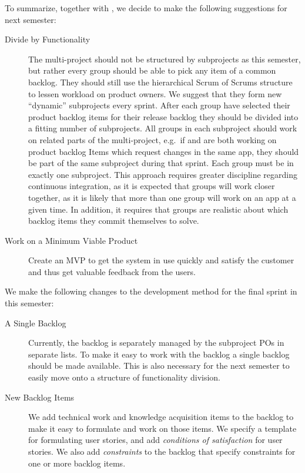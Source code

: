 To summarize, together with , we decide to make the following suggestions for next semester:

\begin{description}
  \item[Divide by Functionality] The multi-project should not be structured by subprojects as this semester, but rather every group should be able to pick any item of a common backlog. They should still use the hierarchical Scrum of Scrums structure to lessen workload on product owners. We suggest that they form new ``dynamic'' subprojects every sprint. After each group have selected their product backlog items for their release backlog they should be divided into a fitting number of subprojects. All groups in each subproject should work on related parts of the multi-project, e.g.\ if  and  are both working on product backlog Items which request changes in the same app, they should be part of the same subproject during that sprint. Each group must be in exactly one subproject. This approach requires greater discipline regarding continuous integration, as it is expected that groups will work closer together, as it is likely that more than one group will work on an app at a given time. In addition, it requires that groups are realistic about which backlog items they commit themselves to solve.
  \item[Work on a Minimum Viable Product] Create an MVP to get the system in use quickly and satisfy the customer and thus get valuable feedback from the users.
\end{description}

We make the following changes to the development method for the final sprint in this semester:

\begin{description}
  \item[A Single Backlog] Currently, the backlog is separately managed by the subproject POs in separate lists. To make it easy to work with the backlog a single backlog should be made available. This is also necessary for the next semester to easily move onto a structure of functionality division.
  \item[New Backlog Items] We add technical work and knowledge acquisition items to the backlog to make it easy to formulate and work on those items. We specify a template for formulating user stories, and add \emph{conditions of satisfaction} for user stories. We also add \emph{constraints} to the backlog that specify constraints for one or more backlog items.
\end{description}

